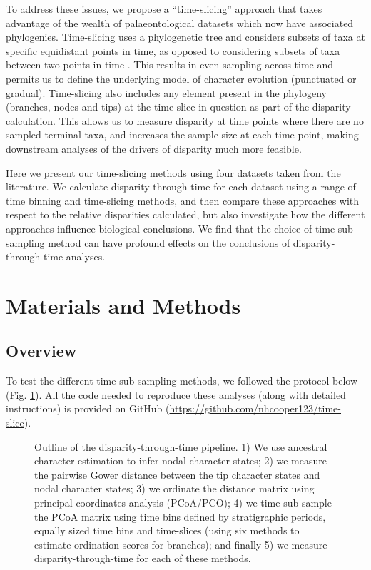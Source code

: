 \documentclass[12pt,a4paper]{article}
\begin{document}
To address these issues, we propose a ``time-slicing'' approach that takes advantage of the wealth of palaeontological datasets which now have associated phylogenies. 
Time-slicing uses a phylogenetic tree and considers subsets of taxa at specific equidistant points in time, as opposed to considering subsets of taxa between two points in time \citep[a similar approach is outlined in][]{halliday2016eutherian}.
This results in even-sampling across time and permits us to define the underlying model of character evolution (punctuated or gradual).  
Time-slicing also includes any element present in the phylogeny (branches, nodes and tips) at the time-slice in question as part of the disparity calculation.
This allows us to measure disparity at time points where there are no sampled terminal taxa, and increases the sample size at each time point, making downstream analyses of the drivers of disparity much more feasible.

Here we present our time-slicing methods using four datasets taken from the literature.
We calculate disparity-through-time for each dataset using a range of time binning and time-slicing methods, and then compare these approaches with respect to the relative disparities calculated, but also investigate how the different approaches influence biological conclusions. 
We find that the choice of time sub-sampling method can have profound effects on the conclusions of disparity-through-time analyses. 

\section{Materials and Methods}
\subsection{Overview}
\label{overview-section}
To test the different time sub-sampling methods, we followed the protocol below (Fig. \ref{fig:overview}). 
All the code needed to reproduce these analyses (along with detailed instructions) is provided on GitHub (\url{https://github.com/nhcooper123/time-slice}).

\begin{figure}[!htbp]
    \centering
    \caption[Outline of the disparity-through-time pipeline]
    {Outline of the disparity-through-time pipeline. 1) We use ancestral character estimation to infer nodal character states; 2) we measure the pairwise Gower distance between the tip character states and nodal character states; 3) we ordinate the distance matrix using principal coordinates analysis (PCoA/PCO); 4) we time sub-sample the PCoA matrix using time bins defined by stratigraphic periods, equally sized time bins and time-slices (using six methods to estimate ordination scores for branches); and finally 5) we measure disparity-through-time for each of these methods.}
    \label{fig:overview}
\end{figure}
\end{document}
